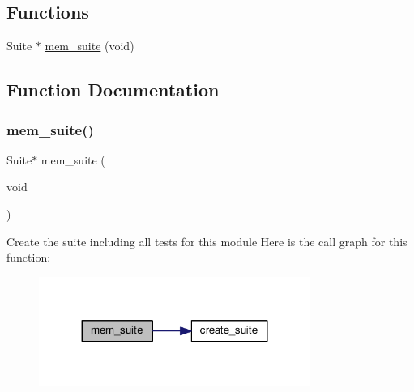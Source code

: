 \subsection*{Functions}
\begin{DoxyCompactItemize}
\item 
Suite $\ast$ \hyperlink{openmote-cc2538_2lwip_2test_2unit_2core_2test__mem_8h_af649d46623811eaa8d7d7943a227ccc3}{mem\+\_\+suite} (void)
\end{DoxyCompactItemize}


\subsection{Function Documentation}
\mbox{\label{openmote-cc2538_2lwip_2test_2unit_2core_2test__mem_8h_af649d46623811eaa8d7d7943a227ccc3}} 
\subsubsection{\texorpdfstring{mem\+\_\+suite()}{mem\_suite()}}
{\footnotesize\ttfamily Suite$\ast$ mem\+\_\+suite (\begin{DoxyParamCaption}\item[{void}]{ }\end{DoxyParamCaption})}

Create the suite including all tests for this module Here is the call graph for this function\+:
\nopagebreak
\begin{figure}[H]
\begin{center}
\leavevmode
\includegraphics[width=251pt]{openmote-cc2538_2lwip_2test_2unit_2core_2test__mem_8h_af649d46623811eaa8d7d7943a227ccc3_cgraph}
\end{center}
\end{figure}

